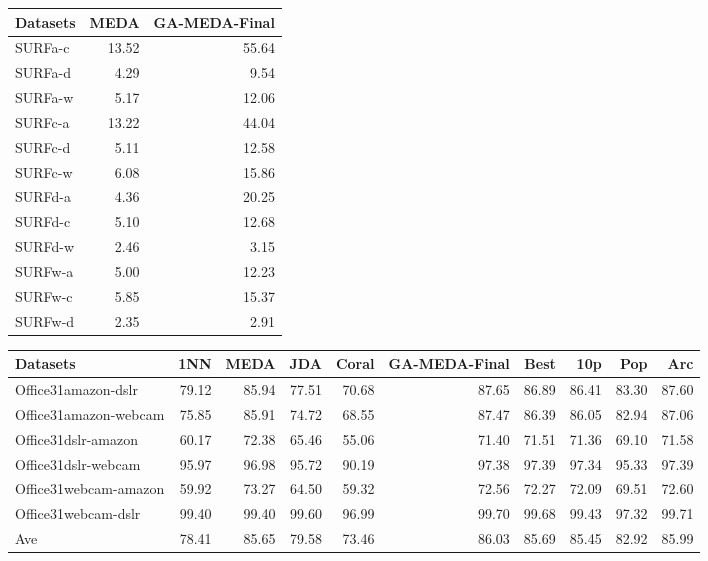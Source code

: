 \documentclass[a4paper]{article}
\begin{document}
\begin{tabular}{lrr}
	\toprule
	Datasets &   MEDA &  GA-MEDA-Final \\
	\midrule
	SURFa-c &  13.52 &          55.64 \\
	SURFa-d &   4.29 &           9.54 \\
	SURFa-w &   5.17 &          12.06 \\
	SURFc-a &  13.22 &          44.04 \\
	SURFc-d &   5.11 &          12.58 \\
	SURFc-w &   6.08 &          15.86 \\
	SURFd-a &   4.36 &          20.25 \\
	SURFd-c &   5.10 &          12.68 \\
	SURFd-w &   2.46 &           3.15 \\
	SURFw-a &   5.00 &          12.23 \\
	SURFw-c &   5.85 &          15.37 \\
	SURFw-d &   2.35 &           2.91 \\
	\bottomrule
\end{tabular}

\begin{tabular}{lrrrrrrrrr}
	\toprule
	Datasets &    1NN &   MEDA &    JDA &  Coral &  GA-MEDA-Final &   Best &    10p &    Pop &    Arc \\
	\midrule
	Office31amazon-dslr &  79.12 &  85.94 &  77.51 &  70.68 &          87.65 &  86.89 &  86.41 &  83.30 &  87.60 \\
	Office31amazon-webcam &  75.85 &  85.91 &  74.72 &  68.55 &          87.47 &  86.39 &  86.05 &  82.94 &  87.06 \\
	Office31dslr-amazon &  60.17 &  72.38 &  65.46 &  55.06 &          71.40 &  71.51 &  71.36 &  69.10 &  71.58 \\
	Office31dslr-webcam &  95.97 &  96.98 &  95.72 &  90.19 &          97.38 &  97.39 &  97.34 &  95.33 &  97.39 \\
	Office31webcam-amazon &  59.92 &  73.27 &  64.50 &  59.32 &          72.56 &  72.27 &  72.09 &  69.51 &  72.60 \\
	Office31webcam-dslr &  99.40 &  99.40 &  99.60 &  96.99 &          99.70 &  99.68 &  99.43 &  97.32 &  99.71 \\
	Ave &  78.41 &  85.65 &  79.58 &  73.46 &          86.03 &  85.69 &  85.45 &  82.92 &  85.99 \\
	\bottomrule
\end{tabular}
\end{document}
